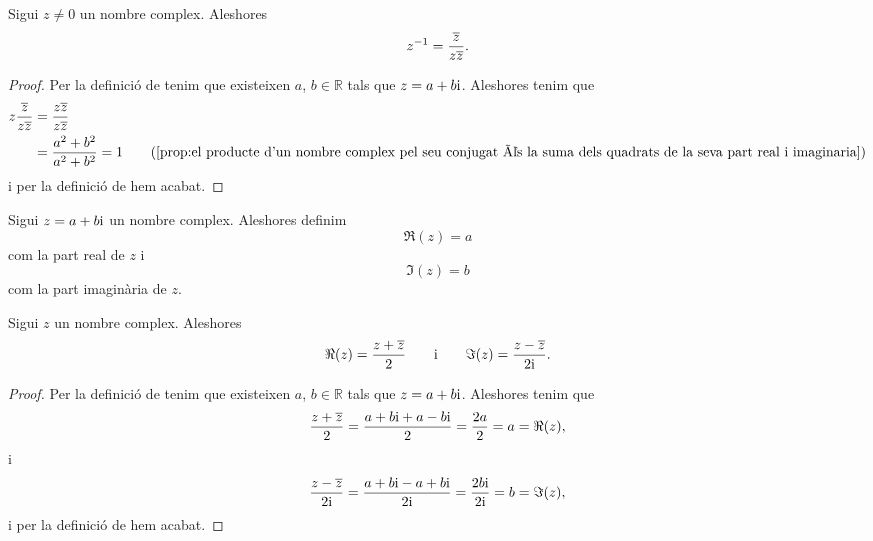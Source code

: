 \documentclass[../Apunts.tex]{subfiles}
\begin{document}
	\begin{proposition}
		\label{prop:inversa d'un nombre complex en funció del seu conjugat}
		Sigui \(z\neq0\) un nombre complex. Aleshores
		\[z^{-1}=\frac{\overline{z}}{z\overline{z}}.\]
		\begin{proof}
			Per la definició de  tenim que existeixen \(a\), \(b\in\mathbb{R}\) tals que \(z=a+b\mathrm{i}\). Aleshores tenim que
			\begin{align*}
				z\frac{\conjugat{z}}{z\conjugat{z}}&=\frac{z\conjugat{z}}{z\conjugat{z}} \\
				&=\frac{a^{2}+b^{2}}{a^{2}+b^{2}}=1 \tag{\ref{prop:el producte d'un nombre complex pel seu conjugat és la suma dels quadrats de la seva part real i imaginaria}}
			\end{align*}
			i per la definició de  hem acabat.
		\end{proof}
	\end{proposition}
	\begin{definition}
		\label{def:part real i part imaginària d'un nombre complex}
		\label{def:part real d'un nombre complex}
		\label{def:part imaginària d'un nombre complex}
		Sigui \(z=a+b\mathrm{i}\) un nombre complex. Aleshores definim
		\[\Re(z)=a\]
		com la part real de \(z\) i
		\[\Im(z)=b\]
		com la part imaginària de \(z\).
	\end{definition}
	\begin{proposition}
		\label{prop:fórmules per la part real i part imaginària d'un nombre complex}
		\label{prop:fórmula per la part real d'un nombre complex}
		\label{prop:fórmula per la part imaginària d'un nombre complex}
		Sigui \(z\) un nombre complex. Aleshores
		\[\Re(z)=\frac{z+\overline{z}}{2}\qquad\text{i}\qquad\Im(z)=\frac{z-\overline{z}}{2\mathrm{i}}.\]
		\begin{proof}
			Per la definició de  tenim que existeixen \(a\), \(b\in\mathbb{R}\) tals que \(z=a+b\mathrm{i}\). Aleshores tenim que
			\[\frac{z+\overline{z}}{2}=\frac{a+b\mathrm{i}+a-b\mathrm{i}}{2}=\frac{2a}{2}=a=\Re(z),\]
			i
			\[\frac{z-\overline{z}}{2\mathrm{i}}=\frac{a+b\mathrm{i}-a+b\mathrm{i}}{2\mathrm{i}}=\frac{2b\mathrm{i}}{2\mathrm{i}}=b=\Im(z),\]
			i per la definició de  hem acabat.
		\end{proof}
	\end{proposition}
\end{document}
